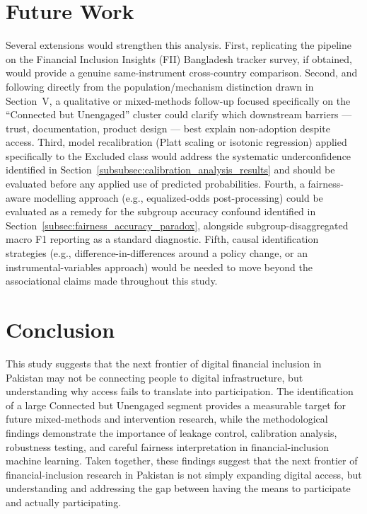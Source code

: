 \documentclass[conference]{IEEEtran}
\begin{document}
\section{Future Work}
\label{sec:future_work}
Several extensions would strengthen this analysis. 
First, replicating the pipeline on the Financial Inclusion Insights (FII) Bangladesh tracker survey, if obtained, would provide a genuine same-instrument cross-country comparison. 
Second, and following directly from the population/mechanism distinction
drawn in Section~V, a qualitative or mixed-methods follow-up focused
specifically on the ``Connected but Unengaged'' cluster could clarify
which downstream barriers --- trust, documentation, product design ---
best explain non-adoption despite access.
Third, model recalibration (Platt scaling or isotonic regression) applied specifically to the Excluded class would address the systematic underconfidence identified in Section~\ref{subsubsec:calibration_analysis_results} and should be evaluated before any applied use of predicted probabilities. Fourth, a fairness-aware modelling approach (e.g., equalized-odds post-processing) could be evaluated as a remedy for the subgroup accuracy confound identified in Section~\ref{subsec:fairness_accuracy_paradox}, alongside subgroup-disaggregated macro F1 reporting as a standard diagnostic. Fifth, causal identification strategies (e.g., difference-in-differences around a policy change, or an instrumental-variables approach) would be needed to move beyond the associational claims made throughout this study.
 
\section{Conclusion}
\label{sec:conclusion}
This study suggests that the next frontier of digital financial inclusion 
in Pakistan may not be connecting people to digital infrastructure, but 
understanding why access fails to translate into participation. The 
identification of a large Connected but Unengaged segment provides a 
measurable target for future mixed-methods and intervention research, 
while the methodological findings demonstrate the importance of leakage 
control, calibration analysis, robustness testing, and careful fairness 
interpretation in financial-inclusion machine learning. Taken together, 
these findings suggest that the next frontier of financial-inclusion research in Pakistan is not simply expanding digital access, but understanding and addressing the gap between having the means to participate and actually participating.
 
\end{document}
